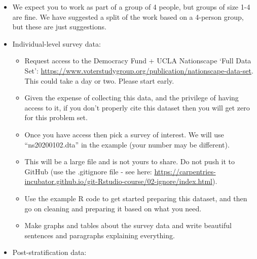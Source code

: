 \documentclass[
]{book}
\providecommand{\tightlist}{%
  \setlength{\itemsep}{0pt}\setlength{\parskip}{0pt}}
\begin{document}
\begin{itemize}
\tightlist
\item
  We expect you to work as part of a group of 4 people, but groups of size 1-4 are fine. We have suggested a split of the work based on a 4-person group, but these are just suggestions.
\item
  Individual-level survey data:

  \begin{itemize}
  \tightlist
  \item
    Request access to the Democracy Fund + UCLA Nationscape `Full Data Set': \url{https://www.voterstudygroup.org/publication/nationscape-data-set}. This could take a day or two. Please start early.
  \item
    Given the expense of collecting this data, and the privilege of having access to it, if you don't properly cite this dataset then you will get zero for this problem set.
  \item
    Once you have access then pick a survey of interest. We will use ``ns20200102.dta'' in the example (your number may be different).
  \item
    This will be a large file and is not yours to share. Do not push it to GitHub (use the .gitignore file - see here: \url{https://carpentries-incubator.github.io/git-Rstudio-course/02-ignore/index.html}).
  \item
    Use the example R code to get started preparing this dataset, and then go on cleaning and preparing it based on what you need.
  \item
    Make graphs and tables about the survey data and write beautiful sentences and paragraphs explaining everything.
  \end{itemize}
\item
  Post-stratification data:


\end{itemize}
\end{document}
